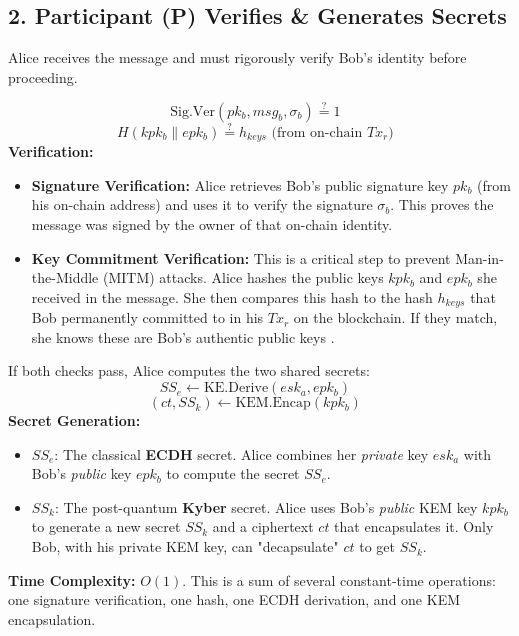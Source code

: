\documentclass[12pt]{article}
\begin{document}
\subsection*{2. Participant (P) Verifies \& Generates Secrets}
Alice receives the message and must rigorously verify Bob's identity before proceeding.

\[
\text{Sig.Ver}(pk_b, msg_b, \sigma_b) \stackrel{?}{=} 1 \text{ }
\]
\[
H(kpk_b \parallel epk_b) \stackrel{?}{=} h_{keys} \text{ (from on-chain } Tx_r) \text{ }
\]
\textbf{Verification:}
\begin{itemize}
    \item \textbf{Signature Verification:} Alice retrieves Bob's public signature key \(pk_b\) (from his on-chain address) and uses it to verify the signature \(\sigma_b\). This proves the message was signed by the owner of that on-chain identity.
    \item \textbf{Key Commitment Verification:} This is a critical step to prevent Man-in-the-Middle (MITM) attacks. Alice hashes the public keys \(kpk_b\) and \(epk_b\) she received in the message. She then compares this hash to the hash \(h_{keys}\) that Bob permanently committed to in his \(Tx_r\) on the blockchain. If they match, she knows these are Bob's authentic public keys .
\end{itemize}
If both checks pass, Alice computes the two shared secrets:
\[
SS_e \leftarrow \text{KE.Derive}(esk_a, epk_b) \text{ }
\]
\[
(ct, SS_k) \leftarrow \text{KEM.Encap}(kpk_b) \text{ }
\]
\textbf{Secret Generation:}
\begin{itemize}
    \item \textbf{\(SS_e\)}: The classical \textbf{ECDH} secret. Alice combines her \textit{private} key \(esk_a\) with Bob's \textit{public} key \(epk_b\) to compute the secret \(SS_e\).
    \item \textbf{\(SS_k\)}: The post-quantum \textbf{Kyber} secret. Alice uses Bob's \textit{public} KEM key \(kpk_b\) to generate a new secret \(SS_k\) and a ciphertext \(ct\) that encapsulates it. Only Bob, with his private KEM key, can "decapsulate" \(ct\) to get \(SS_k\).
\end{itemize}
\textbf{Time Complexity:} \( O(1) \). This is a sum of several constant-time operations: one signature verification, one hash, one ECDH derivation, and one KEM encapsulation.
\end{document}
